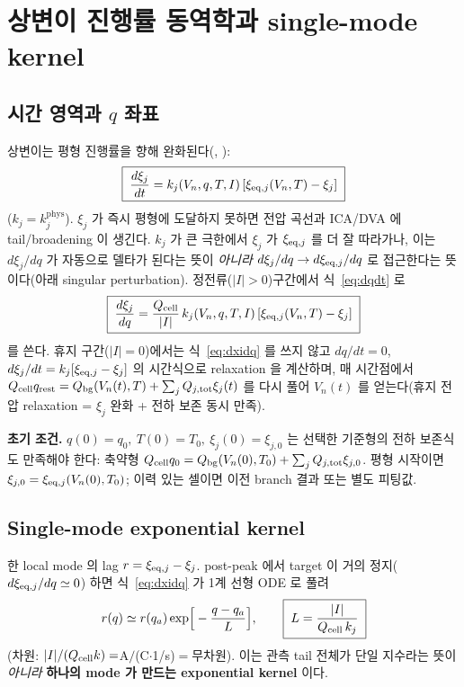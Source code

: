\section{상변이 진행률 동역학과 single-mode kernel}\label{sec:dyn}
\subsection{시간 영역과 $q$ 좌표}
상변이는 평형 진행률을 향해 완화된다(, \cite{onsager1931,degrootmazur1962}):
\begin{equation}
\boxed{\;\frac{d\xi_j}{dt}=k_j(V_n,q,T,I)\,[\xi_{\mathrm{eq},j}(V_n,T)-\xi_j]\;}
\label{eq:dxidt}
\end{equation}
($k_j=k_j^\mathrm{phys}$). $\xi_j$ 가 즉시 평형에 도달하지 못하면 전압 곡선과 ICA/DVA 에 tail/broadening 이
생긴다. $k_j$ 가 큰 극한에서 $\xi_j$ 가 $\xi_{\mathrm{eq},j}$ 를 더 잘 따라가나, 이는 $d\xi_j/dq$ 가 자동으로
델타가 된다는 뜻이 \emph{아니라} $d\xi_j/dq\to d\xi_{\mathrm{eq},j}/dq$ 로 접근한다는 뜻이다(아래 singular
perturbation). 정전류($|I|>0$)구간에서 식~\eqref{eq:dqdt} 로
\begin{equation}
\boxed{\;\frac{d\xi_j}{dq}=\frac{Q_{\mathrm{cell}}}{|I|}\,k_j(V_n,q,T,I)\,[\xi_{\mathrm{eq},j}(V_n,T)-\xi_j]\;}
\label{eq:dxidq}
\end{equation}
를 쓴다. 휴지 구간($|I|=0$)에서는 식~\eqref{eq:dxidq} 를 쓰지 않고 $dq/dt=0$, $d\xi_j/dt=k_j[\xi_{\mathrm{eq},j}-\xi_j]$
의 시간식으로 relaxation 을 계산하며, 매 시간점에서 $Q_{\mathrm{cell}} q_\mathrm{rest}=Q_{\mathrm{bg}}(V_n(t),T)+\sum_j
Q_{j,\mathrm{tot}}\xi_j(t)$ 를 다시 풀어 $V_n(t)$ 를 얻는다(휴지 전압 relaxation = $\xi_j$ 완화 + 전하 보존 동시 만족).

\textbf{초기 조건.} $q(0)=q_0,\ T(0)=T_0,\ \xi_j(0)=\xi_{j,0}$ 는 선택한 기준형의 전하 보존식도 만족해야
한다: 축약형 $Q_{\mathrm{cell}} q_0=Q_{\mathrm{bg}}(V_n(0),T_0)+\sum_j Q_{j,\mathrm{tot}}\xi_{j,0}$. 평형 시작이면
$\xi_{j,0}=\xi_{\mathrm{eq},j}(V_n(0),T_0)$; 이력 있는 셀이면 이전 branch 결과 또는 별도 피팅값.

\subsection{Single-mode exponential kernel}\label{sec:singlemode}
한 local mode 의 lag $r=\xi_{\mathrm{eq},j}-\xi_j$. post-peak 에서 target 이 거의 정지($d\xi_{\mathrm{eq},j}/dq\simeq0$)
하면 식~\eqref{eq:dxidq} 가 1계 선형 ODE 로 풀려
\begin{equation}
r(q)\simeq r(q_a)\exp\!\Big[-\frac{q-q_a}{L}\Big],\qquad \boxed{\;L=\frac{|I|}{Q_{\mathrm{cell}}\,k_j}\;}
\label{eq:single_kernel}
\end{equation}
(차원: $|I|/(Q_{\mathrm{cell}} k)=$A$/$(C$\cdot$1/s)$=$무차원). 이는 관측 tail 전체가 단일 지수라는 뜻이 \emph{아니라}
\textbf{하나의 mode 가 만드는 exponential kernel} 이다.

